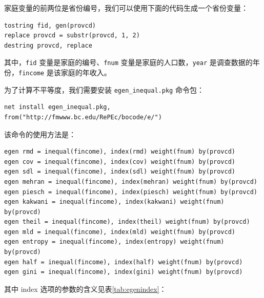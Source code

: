 家庭变量的前两位是省份编号，我们可以使用下面的代码生成一个省份变量：

\begin{lstlisting}
tostring fid, gen(provcd)
replace provcd = substr(provcd, 1, 2)
destring provcd, replace
\end{lstlisting}

其中，\texttt{fid} 变量是家庭的编号、\texttt{fnum} 变量是家庭的人口数，\texttt{year} 是调查数据的年份，\texttt{fincome} 是该家庭的年收入。

为了计算不平等度，我们需要安装 \texttt{egen\_inequal.pkg} 命令包：

\begin{lstlisting}
net install egen_inequal.pkg, from("http://fmwww.bc.edu/RePEc/bocode/e/")
\end{lstlisting}

该命令的使用方法是：

\begin{lstlisting}
egen rmd = inequal(fincome), index(rmd) weight(fnum) by(provcd)
egen cov = inequal(fincome), index(cov) weight(fnum) by(provcd)
egen sdl = inequal(fincome), index(sdl) weight(fnum) by(provcd)
egen mehran = inequal(fincome), index(mehran) weight(fnum) by(provcd)
egen piesch = inequal(fincome), index(piesch) weight(fnum) by(provcd)
egen kakwani = inequal(fincome), index(kakwani) weight(fnum) by(provcd)
egen theil = inequal(fincome), index(theil) weight(fnum) by(provcd)
egen mld = inequal(fincome), index(mld) weight(fnum) by(provcd)
egen entropy = inequal(fincome), index(entropy) weight(fnum) by(provcd)
egen half = inequal(fincome), index(half) weight(fnum) by(provcd)
egen gini = inequal(fincome), index(gini) weight(fnum) by(provcd)
\end{lstlisting}

其中 index 选项的参数的含义见表\ref{tab:egenindex}：

